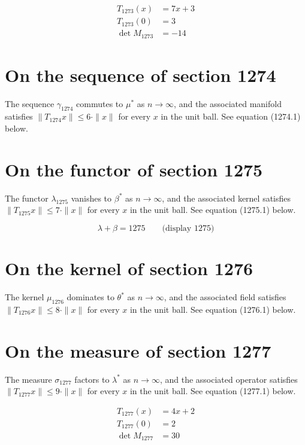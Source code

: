 \documentclass{article}
\begin{document}
\begin{align}
T_{1273}(x) &= 7 x + 3 \\
T_{1273}(0) &= 3 \\
\det M_{1273} &= -14
\end{align}

\section{On the sequence of section 1274}
The sequence $\gamma_{1274}$ commutes to $\mu^{*}$ as $n \to \infty$,
and the associated manifold satisfies $\|T_{1274} x\| \leq 6 \cdot \|x\|$
for every $x$ in the unit ball. See equation (1274.1) below.

\section{On the functor of section 1275}
The functor $\lambda_{1275}$ vanishes to $\beta^{*}$ as $n \to \infty$,
and the associated kernel satisfies $\|T_{1275} x\| \leq 7 \cdot \|x\|$
for every $x$ in the unit ball. See equation (1275.1) below.

$$
\lambda + \beta = 1275 \qquad \text{(display 1275)}
$$

\section{On the kernel of section 1276}
The kernel $\mu_{1276}$ dominates to $\theta^{*}$ as $n \to \infty$,
and the associated field satisfies $\|T_{1276} x\| \leq 8 \cdot \|x\|$
for every $x$ in the unit ball. See equation (1276.1) below.

\section{On the measure of section 1277}
The measure $\sigma_{1277}$ factors to $\lambda^{*}$ as $n \to \infty$,
and the associated operator satisfies $\|T_{1277} x\| \leq 9 \cdot \|x\|$
for every $x$ in the unit ball. See equation (1277.1) below.

\begin{align}
T_{1277}(x) &= 4 x + 2 \\
T_{1277}(0) &= 2 \\
\det M_{1277} &= 30
\end{align}
\end{document}
